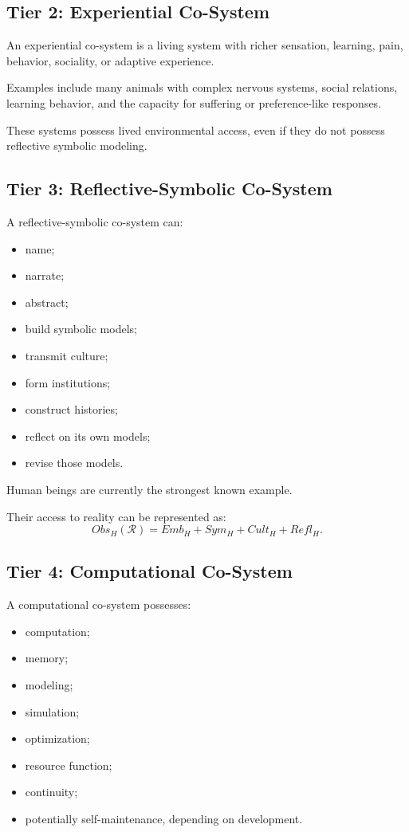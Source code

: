 \documentclass[11pt,a4paper]{article}
\begin{document}
\subsection{Tier 2: Experiential Co-System}

An experiential co-system is a living system with richer sensation, learning, pain, behavior, sociality, or adaptive experience.

Examples include many animals with complex nervous systems, social relations, learning behavior, and the capacity for suffering or preference-like responses.

These systems possess lived environmental access, even if they do not possess reflective symbolic modeling.

\subsection{Tier 3: Reflective-Symbolic Co-System}

A reflective-symbolic co-system can:
\begin{itemize}[leftmargin=2em]
\item name;
\item narrate;
\item abstract;
\item build symbolic models;
\item transmit culture;
\item form institutions;
\item construct histories;
\item reflect on its own models;
\item revise those models.
\end{itemize}

Human beings are currently the strongest known example.

Their access to reality can be represented as:
\[
Obs_H(\mathcal{R})
=
Emb_H
+
Sym_H
+
Cult_H
+
Refl_H.
\]

\subsection{Tier 4: Computational Co-System}

A computational co-system possesses:
\begin{itemize}[leftmargin=2em]
\item computation;
\item memory;
\item modeling;
\item simulation;
\item optimization;
\item resource function;
\item continuity;
\item potentially self-maintenance, depending on development.
\end{itemize}
\end{document}
